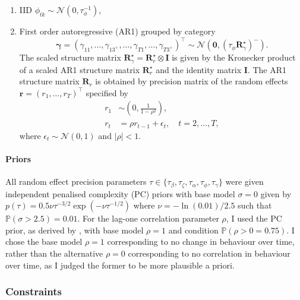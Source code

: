 \documentclass[a4paper, nobind]{templates/ociamthesis}
\providecommand{\tightlist}{%
  \setlength{\itemsep}{0pt}\setlength{\parskip}{0pt}}
\begin{document}
\begin{enumerate}
\def\labelenumi{\arabic{enumi}.}
\tightlist
\item
  IID \(\phi_{tk} \sim \mathcal{N}(0, \tau_\phi^{-1})\),
\item
  First order autoregressive (AR1) grouped by category
  \[
  \bm{\gamma} = (\gamma_{11}, \ldots, \gamma_{13^{+}}, \ldots, \gamma_{T1}, \ldots, \gamma_{T3^{+}})^\top \sim \mathcal{N}(\mathbf{0}, (\tau_\phi \mathbf{R}^\star_\gamma)^{-}).
  \]
  The scaled structure matrix \(\mathbf{R}^\star_\gamma = \mathbf{R}^\star_r \otimes \mathbf{I}\) is given by the Kronecker product of a scaled AR1 structure matrix \(\mathbf{R}^\star_r\) and the identity matrix \(\mathbf{I}\).
  The AR1 structure matrix \(\mathbf{R}_r\) is obtained by precision matrix of the random effects \(\mathbf{r} = (r_1, \ldots, r_T)^\top\) specified by
  \begin{align}
  r_1 &\sim \left( 0, \frac{1}{1 - \rho^2} \right), \\
  r_t &= \rho r_{t - 1} + \epsilon_t, \quad t = 2, \ldots, T, 
  \end{align}
  where \(\epsilon_t \sim \mathcal{N}(0, 1)\) and \(|\rho| < 1\).
\end{enumerate}

\hypertarget{priors-1}{%
\paragraph{Priors}\label{priors-1}}

All random effect precision parameters \(\tau \in \{\tau_\beta, \tau_\zeta, \tau_\alpha, \tau_\phi, \tau_\gamma\}\) were given independent penalised complexity (PC) priors \autocite{simpson2017penalising} with base model \(\sigma = 0\) given by \(p(\tau) = 0.5 \nu \tau^{-3/2} \exp \left( - \nu \tau^{-1/2} \right)\) where \(\nu = - \ln(0.01) / 2.5\) such that \(\mathbb{P}(\sigma > 2.5) = 0.01\).
For the lag-one correlation parameter \(\rho\), I used the PC prior, as derived by \textcite{sorbye2017penalised}, with base model \(\rho = 1\) and condition \(\mathbb{P}(\rho > 0 = 0.75)\).
I chose the base model \(\rho = 1\) corresponding to no change in behaviour over time, rather than the alternative \(\rho = 0\) corresponding to no correlation in behaviour over time, as I judged the former to be more plausible a priori.

\hypertarget{constraints}{%
\subsubsection{Constraints}\label{constraints}}
\end{document}
